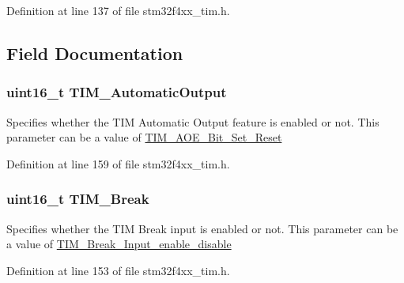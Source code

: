 Definition at line 137 of file stm32f4xx\-\_\-tim.\-h.



\subsection{Field Documentation}
\hypertarget{struct_t_i_m___b_d_t_r_init_type_def_a85ef0b5598749ffd67dd360e615bcf9a}{
\subsubsection[{T\-I\-M\-\_\-\-Automatic\-Output}]{\setlength{\rightskip}{0pt plus 5cm}uint16\-\_\-t T\-I\-M\-\_\-\-Automatic\-Output}}\label{struct_t_i_m___b_d_t_r_init_type_def_a85ef0b5598749ffd67dd360e615bcf9a}
Specifies whether the T\-I\-M Automatic Output feature is enabled or not. This parameter can be a value of \hyperlink{group___t_i_m___a_o_e___bit___set___reset}{T\-I\-M\-\_\-\-A\-O\-E\-\_\-\-Bit\-\_\-\-Set\-\_\-\-Reset} 

Definition at line 159 of file stm32f4xx\-\_\-tim.\-h.

\hypertarget{struct_t_i_m___b_d_t_r_init_type_def_a7f141e06bab7928bc0b8327f0d20e664}{
\subsubsection[{T\-I\-M\-\_\-\-Break}]{\setlength{\rightskip}{0pt plus 5cm}uint16\-\_\-t T\-I\-M\-\_\-\-Break}}\label{struct_t_i_m___b_d_t_r_init_type_def_a7f141e06bab7928bc0b8327f0d20e664}
Specifies whether the T\-I\-M Break input is enabled or not. This parameter can be a value of \hyperlink{group___t_i_m___break___input__enable__disable}{T\-I\-M\-\_\-\-Break\-\_\-\-Input\-\_\-enable\-\_\-disable} 

Definition at line 153 of file stm32f4xx\-\_\-tim.\-h.

